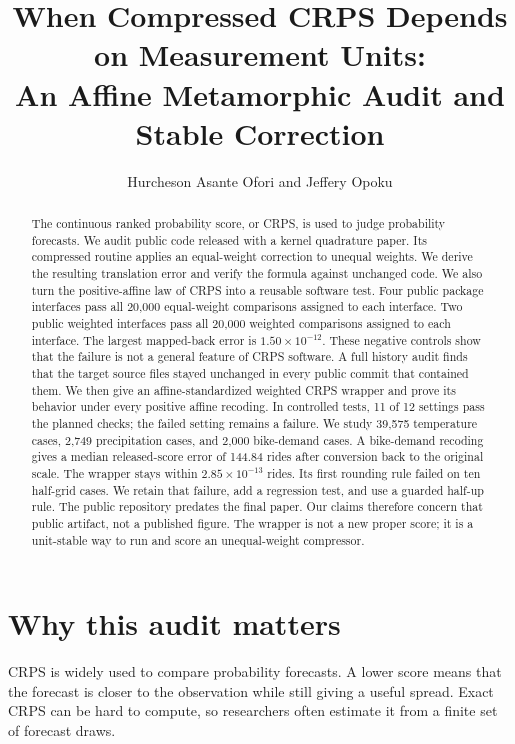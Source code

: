 \documentclass[11pt]{article}
\title{When Compressed CRPS Depends on Measurement Units:\\An Affine Metamorphic Audit and Stable Correction}
\author{Hurcheson Asante Ofori and Jeffery Opoku}
\date{}
\begin{document}
\maketitle

\begin{abstract}
The continuous ranked probability score, or CRPS, is used to judge probability forecasts. We audit public code released with a kernel quadrature paper. Its compressed routine applies an equal-weight correction to unequal weights. We derive the resulting translation error and verify the formula against unchanged code. We also turn the positive-affine law of CRPS into a reusable software test. Four public package interfaces pass all 20,000 equal-weight comparisons assigned to each interface. Two public weighted interfaces pass all 20,000 weighted comparisons assigned to each interface. The largest mapped-back error is $1.50\times10^{-12}$. These negative controls show that the failure is not a general feature of CRPS software. A full history audit finds that the target source files stayed unchanged in every public commit that contained them. We then give an affine-standardized weighted CRPS wrapper and prove its behavior under every positive affine recoding. In controlled tests, 11 of 12 settings pass the planned checks; the failed setting remains a failure. We study 39,575 temperature cases, 2,749 precipitation cases, and 2,000 bike-demand cases. A bike-demand recoding gives a median released-score error of 144.84 rides after conversion back to the original scale. The wrapper stays within $2.85\times10^{-13}$ rides. Its first rounding rule failed on ten half-grid cases. We retain that failure, add a regression test, and use a guarded half-up rule. The public repository predates the final paper. Our claims therefore concern that public artifact, not a published figure. The wrapper is not a new proper score; it is a unit-stable way to run and score an unequal-weight compressor.
\end{abstract}

\section{Why this audit matters}

CRPS is widely used to compare probability forecasts. A lower score means that the forecast is closer to the observation while still giving a useful spread. Exact CRPS can be hard to compute, so researchers often estimate it from a finite set of forecast draws.
\end{document}
